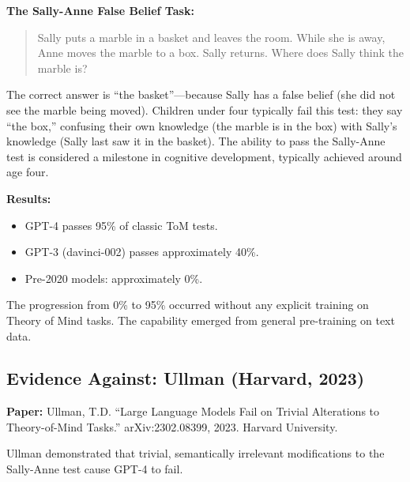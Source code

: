 \documentclass[11pt, a4paper]{article}
\begin{document}
\textbf{The Sally-Anne False Belief Task:}
\begin{quote}
Sally puts a marble in a basket and leaves the room. While she is away, Anne moves the marble to a box. Sally returns. Where does Sally think the marble is?
\end{quote}

The correct answer is ``the basket''---because Sally has a false belief (she did not see the marble being moved). Children under four typically fail this test: they say ``the box,'' confusing their own knowledge (the marble is in the box) with Sally's knowledge (Sally last saw it in the basket). The ability to pass the Sally-Anne test is considered a milestone in cognitive development, typically achieved around age four.

\textbf{Results:}
\begin{itemize}
  \item GPT-4 passes 95\% of classic ToM tests.
  \item GPT-3 (davinci-002) passes approximately 40\%.
  \item Pre-2020 models: approximately 0\%.
\end{itemize}

The progression from 0\% to 95\% occurred without any explicit training on Theory of Mind tasks. The capability emerged from general pre-training on text data.

\subsection{Evidence Against: Ullman (Harvard, 2023)}

\textbf{Paper:} Ullman, T.D. ``Large Language Models Fail on Trivial Alterations to Theory-of-Mind Tasks.'' arXiv:2302.08399, 2023. Harvard University.

Ullman demonstrated that trivial, semantically irrelevant modifications to the Sally-Anne test cause GPT-4 to fail.
\end{document}
